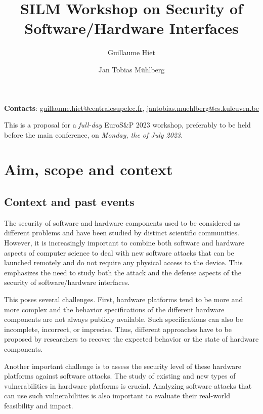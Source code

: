 \documentclass[a4paper,11pt]{article} %
\title{\vspace{-0.5cm}SILM Workshop on Security of Software/Hardware Interfaces}
\date{}
\author{Guillaume Hiet}
\affil{CIDRE team, CentraleSupélec/Inria, IRISA, France}
\author{Jan Tobias M\"uhlberg}
\affil{imec-DistriNet, KU Leuven, Belgium}
\numberwithin{equation}{section} %
\numberwithin{figure}{section} %
\numberwithin{table}{section} %
\newcommand{\SILMYear}{2023}
\newcommand{\SILMDate}{Monday, the \nth{3} of July 2023}
\begin{document}
\maketitle %




\begin{center}
 \textbf{Contacts}:  \url{guillaume.hiet@centralesupelec.fr},
\url{jantobias.muehlberg@cs.kuleuven.be}
\end{center}

\noindent This is a proposal for a \emph{full-day} EuroS\&P \SILMYear{} workshop,
preferably to be held before the main conference, on \emph{\SILMDate}.

\section{Aim, scope and context}
\subsection{Context and past events}

The security of software and hardware components used to be considered as
different problems and have been studied by distinct scientific
communities. However, it is increasingly important to combine both software
and hardware aspects of computer science to deal with new software attacks
that can be launched remotely and do not require any physical access to the
device. This emphasizes the need to study both the attack and the defense
aspects of the security of software/hardware interfaces.

This poses several challenges. First, hardware platforms tend to be more
and more complex and the behavior specifications of the different hardware
components are not always publicly available. Such specifications can also
be incomplete, incorrect, or imprecise. Thus, different approaches have to
be proposed by researchers to recover the expected behavior or the state of
hardware components.

Another important challenge is to assess the security level of these
hardware platforms against software attacks. The study of existing and new
types of vulnerabilities in hardware platforms is crucial. Analyzing 
software attacks that can use such vulnerabilities is also important to
evaluate their real-world feasibility and impact.
\end{document}
